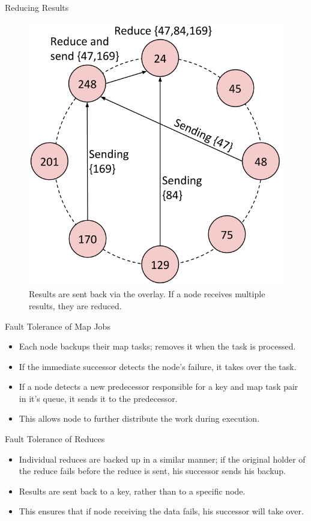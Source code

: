 \documentclass[11pt]{beamer}
\begin{document}
\begin{frame}{Reducing Results}
\begin{figure}
    \includegraphics[width=0.50\linewidth]{CR_dataflow3}
    \caption{Results are sent back via the overlay. If a node receives multiple results, they are reduced.}
\end{figure}
\end{frame}



\begin{frame}{Fault Tolerance of Map Jobs}
\begin{itemize}
	\item Each node backups their map tasks; removes it when the task is processed.
	\item If the immediate successor detects the node's failure, it takes over the task.
	\item If a node detects a new predecessor responsible for a key and map task pair in it's queue, it sends it to the predecessor.
	\item This allows node to further distribute the work during execution.
\end{itemize}
\end{frame}



\begin{frame}{Fault Tolerance of Reduces}
\begin{itemize}
	\item Individual reduces are backed up in a similar manner; if the original holder of the reduce fails before the reduce is sent, his successor sends his backup.
	\item Results are sent back to a key, rather than to a specific node.
	\item This ensures that if node receiving the data fails, his successor will take over.
\end{itemize}
\end{frame}
\end{document}
